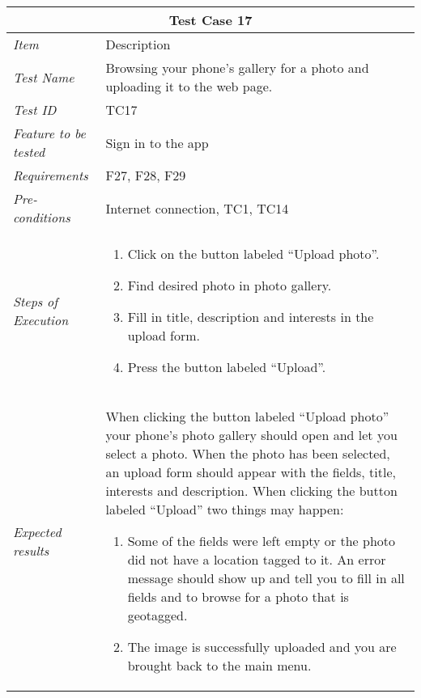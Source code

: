 %
\begin{minipage}{\linewidth}
\setlength{\tabcolsep}{15pt}
\centering
{}
\begin{tabular}{ |l|p{70mm}| }
	\hline
	\multicolumn{2}{|c|}{\cellcolor{gray!25} \textbf{Test Case 17}} \\
	\hline
	\it{\cellcolor{gray!25}Item} & {\cellcolor{gray!25} Description } \\
	\hline
	\it{\cellcolor{gray!25}Test Name } & Browsing your phone's gallery for a photo and uploading it to the web page. \\ \hline
	\it{\cellcolor{gray!25}Test ID} & TC17 \\ \hline
	\it{\cellcolor{gray!25}Feature to be tested} & Sign in to the app \\ \hline
	\it{\cellcolor{gray!25}Requirements} & F27, F28, F29 \\ \hline
	\it{\cellcolor{gray!25}Pre-conditions} & Internet connection, TC1, TC14 \\ \hline
	\it{\cellcolor{gray!25}Steps of Execution} & \begin{enumerate}
	                                       \item Click on the button labeled “Upload photo”.
	                                       \item Find desired photo in photo gallery.
	                                       \item Fill in title, description and interests in the upload form.
	                                       \item Press the button labeled “Upload”.
	                                     \end{enumerate} \\ \hline
	\it{\cellcolor{gray!25}Expected results} & When clicking the button labeled “Upload photo” your phone's photo gallery should open and let you select  a photo. When the photo has been selected,  an upload form should appear with the fields, title, interests and description. When clicking the button labeled “Upload” two things may happen: \begin{enumerate}[label=\alph*)]
	                                       \item Some of the fields were left empty or the photo did not have a location tagged to it. An error message should show up and tell you to fill in all fields and to browse for a photo that is geotagged.
	                                       \item The image is successfully uploaded and you are brought back to the main menu.
	                                     \end{enumerate} \\
	\hline
\end{tabular}
\medskip
\end{minipage}
